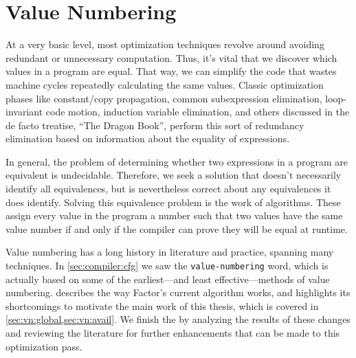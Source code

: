\chapter{Value Numbering}\label{sec:vn}

At a very basic level, most optimization techniques revolve around avoiding
redundant or unnecessary computation.  Thus, it's vital that we discover which
values in a program are equal.  That way, we can simplify the code that wastes
machine cycles repeatedly calculating the same values.  Classic optimization
phases like constant/copy propagation, common subexpression elimination,
loop-invariant code motion, induction variable elimination, and others
discussed in the de facto treatise, ``The Dragon Book'', perform
this sort of redundancy elimination based on information about the equality of
expressions.

In general, the problem of determining whether two expressions in a program are
equivalent is undecidable.  Therefore, we seek a  solution
that doesn't necessarily identify all equivalences, but is nevertheless correct
about any equivalences it does identify.  Solving this equivalence problem is
the work of  algorithms.  These assign every value in the
program a number such that two values have the same value number if and only if
the compiler can prove they will be equal at runtime.

Value numbering has a long history in literature and practice, spanning many
techniques.  In \cref{sec:compiler:cfg} we saw the \Verb|value-numbering|
word, which is actually based on some of the earliest---and least
effective---methods of value numbering.   describes the way
Factor's current algorithm works, and highlights its shortcomings to motivate
the main work of this thesis, which is covered in
\cref{sec:vn:global,sec:vn:avail}.  We finish the  by
analyzing the results of these changes and reviewing the literature for further
enhancements that can be made to this optimization pass.






